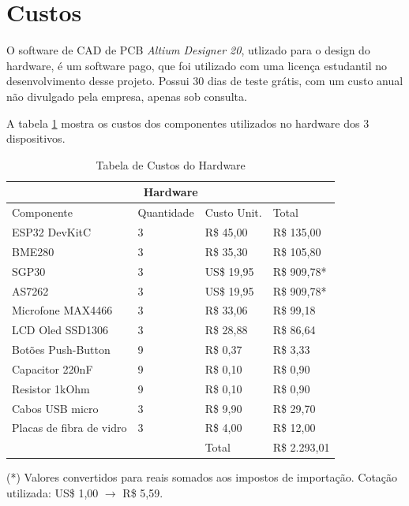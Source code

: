 \documentclass[../monografia.tex]{subfiles}
\begin{document}
\section{Custos}

O software de CAD de PCB \textit{Altium Designer 20}\cite{altium}, utlizado para o design do hardware, é um software pago, que foi utilizado com uma licença estudantil no desenvolvimento desse projeto. Possui 30 dias de teste grátis, com um custo anual não divulgado pela empresa, apenas sob consulta. 

A tabela \ref{table:custos} mostra os custos dos componentes utilizados no hardware dos 3 dispositivos. 

\begin{table}[h]
\centering
\begin{tabular}{ |p{4.5cm}|p{2cm}|p{3cm}|p{3cm}|  }
	\hline
	\multicolumn{4}{|c|}{Hardware} \\
	\hline
	\hline
	Componente & Quantidade & Custo Unit. & Total\\
	\hline
	ESP32 DevKitC 				& 3 & R\$ 45,00   & R\$ 135,00 \\
	BME280 						& 3 & R\$ 35,30   & R\$ 105,80 \\
	SGP30 						& 3 & US\$ 19,95  & R\$ 909,78* \\
	AS7262 						& 3 & US\$ 19,95  & R\$ 909,78* \\
	Microfone MAX4466 			& 3 & R\$ 33,06   & R\$ 99,18 \\
	LCD Oled SSD1306 			& 3 & R\$ 28,88   & R\$ 86,64 \\
	Botões Push-Button 			& 9 & R\$ 0,37    & R\$ 3,33 \\
	Capacitor 220nF 			& 9 & R\$ 0,10    & R\$ 0,90 \\
	Resistor 1kOhm 				& 9 & R\$ 0,10    & R\$ 0,90 \\
	Cabos USB micro 			& 3 & R\$ 9,90    & R\$ 29,70 \\
	Placas de fibra de vidro 	& 3 & R\$ 4,00    & R\$ 12,00 \\
	\hline
	\multicolumn{2}{|c|}{ } & Total & R\$ 2.293,01 \\
	\hline
\end{tabular}
	\caption{Tabela de Custos do Hardware}
	\label{table:custos}

\begin{flushleft}
	(*) Valores convertidos para reais somados aos impostos de importação. Cotação utilizada: US\$ 1,00 $\rightarrow$ R\$ 5,59.
\end{flushleft}
\end{table}
\end{document}
